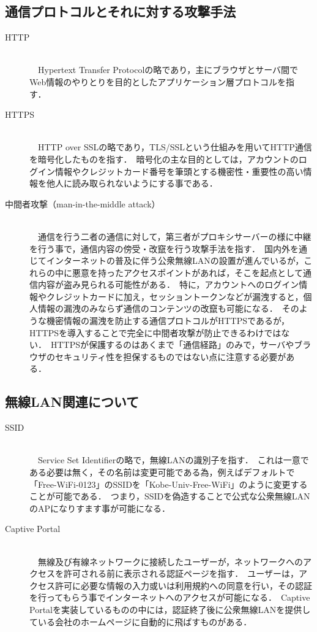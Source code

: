 \documentclass[dvipdfmx]{jsarticle}
\begin{document}
        \subsection{通信プロトコルとそれに対する攻撃手法}
            \begin{description}
                \item[HTTP]\mbox{}\\
                    　Hypertext Transfer Protocolの略であり，主にブラウザとサーバ間でWeb情報のやりとりを目的としたアプリケーション層プロトコルを指す．\
                \item[HTTPS]\mbox{}\\ 
                    　HTTP over SSLの略であり，TLS/SSLという仕組みを用いてHTTP通信を暗号化したものを指す．\
                    暗号化の主な目的としては，アカウントのログイン情報やクレジットカード番号を筆頭とする機密性・重要性の高い情報を他人に読み取られないようにする事である．\
                \item[中間者攻撃（man-in-the-middle attack）]\mbox{}\\ 
                    　通信を行う二者の通信に対して，第三者がプロキシサーバーの様に中継を行う事で，通信内容の傍受・改竄を行う攻撃手法を指す．\
                    国内外を通じてインターネットの普及に伴う公衆無線LANの設置が進んでいるが，これらの中に悪意を持ったアクセスポイントがあれば，そこを起点として通信内容が盗み見られる可能性がある．\
                    特に，アカウントへのログイン情報やクレジットカードに加え，セッショントークンなどが漏洩すると，個人情報の漏洩のみならず通信のコンテンツの改竄も可能になる．\
                    そのような機密情報の漏洩を防止する通信プロトコルがHTTPSであるが，HTTPSを導入することで完全に中間者攻撃が防止できるわけではない．\
                    HTTPSが保護するのはあくまで「通信経路」のみで，サーバやブラウザのセキュリティ性を担保するものではない点に注意する必要がある\cite{AboutMITM}．\
            \end{description}
        \subsection{無線LAN関連について}
            \begin{description}
                \item [SSID]\mbox{}\\
                    　Service Set Identifierの略で，無線LANの識別子を指す．\
                    これは一意である必要は無く，その名前は変更可能である為，例えばデフォルトで「Free-WiFi-0123」のSSIDを「Kobe-Univ-Free-WiFi」のように変更することが可能である．\
                    つまり，SSIDを偽造することで公式な公衆無線LANのAPになりすます事が可能になる．\
                \item [Captive Portal]\mbox{}\\
                    　無線及び有線ネットワークに接続したユーザーが，ネットワークへのアクセスを許可される前に表示される認証ページを指す．\
                    ユーザーは，アクセス許可に必要な情報の入力或いは利用規約への同意を行い，その認証を行ってもらう事でインターネットへのアクセスが可能になる．\
                    Captive Portalを実装しているものの中には，認証終了後に公衆無線LANを提供している会社のホームページに自動的に飛ばすものがある．\
            \end{description}
\end{document}
